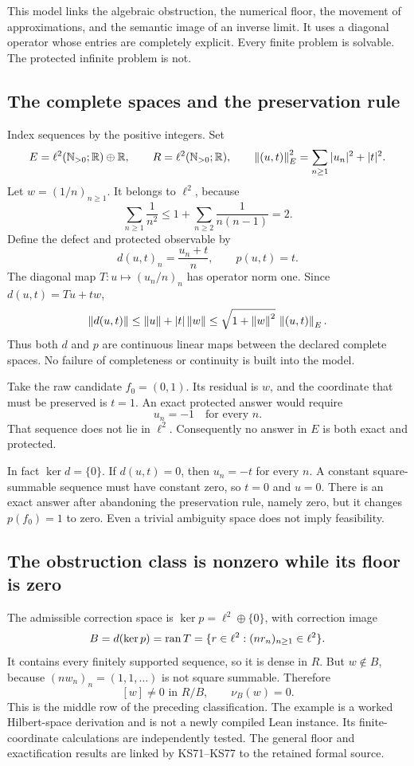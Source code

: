 \clearpage
{}\label{sec:escape}
This model links the algebraic obstruction, the numerical floor, the movement of approximations, and the semantic image of an inverse limit. It uses a diagonal operator whose entries are completely explicit. Every finite problem is solvable. The protected infinite problem is not.

\subsection{The complete spaces and the preservation rule}
Index sequences by the positive integers. Set
\[
 E=\ell^2(\mathbb N_{>0};\mathbb R)\oplus\mathbb R,\qquad
 R=\ell^2(\mathbb N_{>0};\mathbb R),\qquad
 \left\lVert(u,t)\right\rVert_E^2=\sum_{n\ge1}|u_n|^2+|t|^2.
\]
Let \(w=(1/n)_{n\ge1}\). It belongs to \(\ell^2\), because
\[
 \sum_{n\ge1}\frac1{n^2}
 \le1+\sum_{n\ge2}\frac1{n(n-1)}=2.
\]
Define the defect and protected observable by
\[
 d(u,t)_n=\frac{u_n+t}{n},\qquad p(u,t)=t.
\]
The diagonal map \(T:u\mapsto(u_n/n)_n\) has operator norm one. Since \(d(u,t)=Tu+tw\),
\[
 \left\lVert d(u,t)\right\rVert\le\left\lVert u\right\rVert+|t|\left\lVert w\right\rVert
 \le\sqrt{1+\left\lVert w\right\rVert^2}\,\left\lVert(u,t)\right\rVert_E.
\]
Thus both \(d\) and \(p\) are continuous linear maps between the declared complete spaces. No failure of completeness or continuity is built into the model.

Take the raw candidate \(f_0=(0,1)\). Its residual is \(w\), and the coordinate that must be preserved is \(t=1\). An exact protected answer would require
\[
 u_n=-1\quad\text{for every }n.
\]
That sequence does not lie in \(\ell^2\). Consequently no answer in \(E\) is both exact and protected.

In fact \(\ker d=\{0\}\). If \(d(u,t)=0\), then \(u_n=-t\) for every \(n\). A constant square-summable sequence must have constant zero, so \(t=0\) and \(u=0\). There is an exact answer after abandoning the preservation rule, namely zero, but it changes \(p(f_0)=1\) to zero. Even a trivial ambiguity space does not imply feasibility.

\subsection{The obstruction class is nonzero while its floor is zero}
The admissible correction space is \(\ker p=\ell^2\oplus\{0\}\), with correction image
\[
 B=d(\ker p)=\operatorname{ran} T
  =\{r\in\ell^2:(nr_n)_{n\ge1}\in\ell^2\}.
\]
It contains every finitely supported sequence, so it is dense in \(R\). But \(w\notin B\), because \((nw_n)_n=(1,1,\ldots)\) is not square summable. Therefore
\[
 [w]\ne0\text{ in }R/B,\qquad \nu_B(w)=0.
\]
This is the middle row of the preceding classification. The example is a worked Hilbert-space derivation and is not a newly compiled Lean instance. Its finite-coordinate calculations are independently tested. The general floor and exactification results are linked by KS71--KS77 to the retained formal source.

